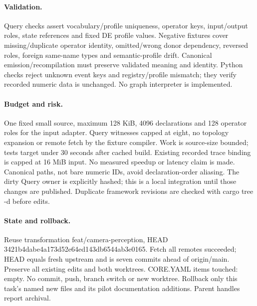 \documentclass[11pt,a4paper]{article}
\begin{document}
\paragraph{Validation.} Query checks assert vocabulary/profile uniqueness,
operator keys, input/output roles, state references and fixed DE profile values.
Negative fixtures cover missing/duplicate operator identity, omitted/wrong donor
dependency, reversed roles, foreign same-name types and semantic-profile drift.
Canonical emission/recompilation must preserve validated meaning and identity.
Python checks reject unknown event keys and registry/profile mismatch; they verify
recorded numeric data is unchanged. No graph interpreter is implemented.
\paragraph{Budget and risk.} One fixed small source, maximum 128 KiB, 4096
declarations and 128 operator roles for the input adapter. Query witnesses capped
at eight, no topology expansion or remote fetch by the fixture compiler. Work is
source-size bounded; tests target under 30 seconds after cached build. Existing
recorded trace binding is capped at 16 MiB input. No measured speedup or latency
claim is made. Canonical paths, not bare numeric IDs, avoid declaration-order
aliasing. The dirty Query owner is explicitly hashed; this is a local integration
until those changes are published. Duplicate framework revisions are checked with
cargo tree -d before edits.
\paragraph{State and rollback.} Reuse transformation feat/camera-perception,
HEAD 3421b4dabe4a173d52e64ed143db6544ab3e0165. Fetch all remotes succeeded;
HEAD equals fresh upstream and is seven commits ahead of origin/main. Preserve all
existing edits and both worktrees. CORE.YAML items touched: empty. No commit,
push, branch switch or new worktree. Rollback only this task's named new files
and its pilot documentation additions. Parent handles report archival.
\begin{center}\end{center}
\end{document}
